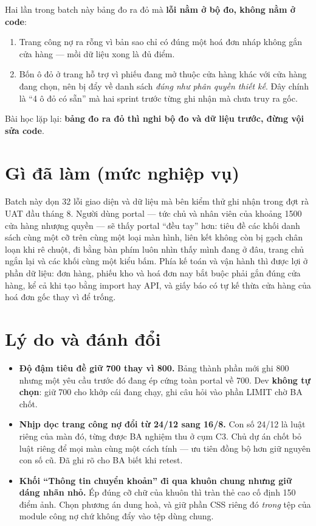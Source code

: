 Hai lần trong batch này bảng đo ra đỏ mà \textbf{lỗi nằm ở bộ đo, không nằm ở code}:

\begin{enumerate}
\item Trang công nợ ra rỗng vì bản sao chỉ có đúng một hoá đơn nháp không gắn cửa hàng ---
  mồi dữ liệu xong là đủ điểm.
\item Bốn ô đỏ ở trang hỗ trợ vì phiếu đang mở thuộc cửa hàng khác với cửa hàng đang chọn, nên
  bị đẩy về danh sách \emph{đúng như phân quyền thiết kế}. Đây chính là ``4 ô đỏ có sẵn'' mà
  hai sprint trước từng ghi nhận mà chưa truy ra gốc.
\end{enumerate}

Bài học lặp lại: \textbf{bảng đo ra đỏ thì nghi bộ đo và dữ liệu trước, đừng vội sửa code}.

\section{Gì đã làm (mức nghiệp vụ)}

Batch này dọn 32 lỗi giao diện và dữ liệu mà bên kiểm thử ghi nhận trong đợt rà UAT đầu tháng
8. Người dùng portal --- tức chủ và nhân viên của khoảng 1500 cửa hàng nhượng quyền --- sẽ thấy
portal ``đều tay'' hơn: tiêu đề các khối danh sách cùng một cỡ trên cùng một loại màn hình,
liên kết không còn bị gạch chân loạn khi rê chuột, đi bằng bàn phím luôn nhìn thấy mình đang ở
đâu, trang chủ ngắn lại và các khối cùng một kiểu bấm. Phía kế toán và vận hành thì được lợi ở
phần dữ liệu: đơn hàng, phiếu kho và hoá đơn nay bắt buộc phải gắn đúng cửa hàng, kể cả khi
tạo bằng import hay API, và giấy báo có tự kế thừa cửa hàng của hoá đơn gốc thay vì để trống.

\section{Lý do và đánh đổi}

\begin{itemize}
\item \textbf{Độ đậm tiêu đề giữ 700 thay vì 800.} Bảng thành phần mới ghi 800 nhưng một yêu
  cầu trước đó đang ép cứng toàn portal về 700. Dev \textbf{không tự chọn}: giữ 700 cho khớp
  cái đang chạy, ghi câu hỏi vào phần LIMIT chờ BA chốt.
\item \textbf{Nhịp dọc trang công nợ đổi từ 24/12 sang 16/8.} Con số 24/12 là luật riêng của
  màn đó, từng được BA nghiệm thu ở cụm C3. Chủ dự án chốt bỏ luật riêng để mọi màn cùng một
  cách tính --- ưu tiên đồng bộ hơn giữ nguyên con số cũ. Đã ghi rõ cho BA biết khi retest.
\item \textbf{Khối ``Thông tin chuyển khoản'' đi qua khuôn chung nhưng giữ dáng nhãn nhỏ.} Ép
  đúng cỡ chữ của khuôn thì tràn thẻ cao cố định 150 điểm ảnh. Chọn phương án dung hoà, và giữ
  phần CSS riêng đó \emph{trong} tệp của module công nợ chứ không đẩy vào tệp dùng chung.
\end{itemize}

